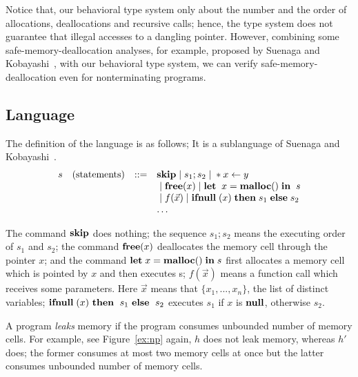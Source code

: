 \documentclass{sigplanconf}
\begin{document}
Notice that, our behavioral type system only about the number and the
order of allocations, deallocations and recursive calls; hence, the
type system does not guarantee that illegal accesses to a dangling
pointer.  However, combining some safe-memory-deallocation analyses,
for example, proposed by Suenaga and
Kobayashi~\cite{DBLP:conf/aplas/SuenagaK09}, with our behavioral type
system, we can verify safe-memory-deallocation even for nonterminating
programs.

\subsection{Language}
The definition of the language is as follows; It
is a sublanguage of Suenaga and Kobayashi~\cite{DBLP:conf/aplas/SuenagaK09}.
\[
\begin{array}{rlcl}
  s & (\mbox{statements})&::=& \mathbf{skip} \;|\; s_{1};s_{2} \;|\; *x \leftarrow y \\
     & & & \;|\; \mathbf{free} (x) \;|\; \mathbf{let}\;\; x = \mathbf{malloc()} \; \mathbf{in}\; \; s  \\ 
  & &  & \;|\; f(\vec{x}) \;|\; \mathbf{ifnull}\;(x) \; \mathbf{then}\; s_{1}\; \mathbf{else}\; s_{2} \\
  & & & \ldots 
\end{array}
\]


The command $\mathbf{skip}$ does nothing; the sequence $s_{1};s_{2}$ means the
executing order of $s_{1}$ and $s_{2}$; the command $\mathbf{free}(x)$
deallocates the memory cell through the pointer $x$; and the command
$\mathbf{let}\; x = \mathbf{malloc()} \; \mathbf{in}\; s$ first allocates a memory cell which is
pointed by $x$ and then executes s; $f(\vec{x})$ means a function call
which receives some parameters. Here $\vec{x}$ means that $\{
x_{1},...,x_{n} \}$, the list of distinct variables;
\(\IFNULL(x)\ \THEN\ s_1\ \ELSE\ s_2\) executes \(s_1\) if \(x\) is
\(\mathbf{null}\), otherwise \(s_2\).

A program \emph{leaks} memory if the program consumes unbounded number
of memory cells.  For example, see Figure~\ref{ex:np} again, \(h\)
does not leak memory, whereas \(h'\) does; the former
consumes at most two memory cells at once but the latter consumes
unbounded number of memory cells.
\end{document}
